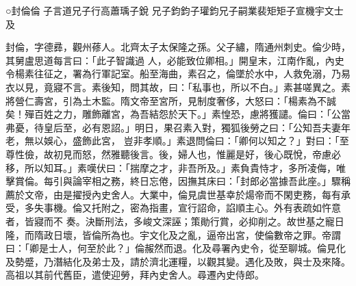
\begin{pinyinscope}

 ○封倫倫
 子言道兄子行高蕭瑀子銳
 兄子鈞鈞子瓘鈞兄子嗣業裴矩矩子宣機宇文士及



 封倫，字德彞，觀州蓚人。北齊太子太保隆之孫。父子繡，隋通州刺史。倫少時，其舅盧思道每言曰：「此子智識過
 人，必能致位卿相。」開皇末，江南作亂，內史令楊素往征之，署為行軍記室。船至海曲，素召之，倫墜於水中，人救免溺，乃易衣以見，竟寢不言。素後知，問其故，曰：「私事也，所以不白。」素甚嗟異之。素將營仁壽宮，引為土木監。隋文帝至宮所，見制度奢侈，大怒曰：「楊素為不誠矣！殫百姓之力，雕飾離宮，為吾結怨於天下。」素惶恐，慮將獲譴。倫曰：「公當弗憂，待皇后至，必有恩詔。」明日，果召素入對，獨狐後勞之曰：「公知吾夫妻年老，無以娛心，盛飾此宮，
 豈非孝順。」素退問倫曰：「卿何以知之？」對曰：「至尊性儉，故初見而怒，然雅聽後言。後，婦人也，惟麗是好，後心既悅，帝慮必移，所以知耳。」素嘆伏曰：「揣摩之才，非吾所及。」素負貴恃才，多所凌侮，唯擊賞倫。每引與論宰相之務，終日忘倦，因撫其床曰：「封郎必當據吾此座。」驟稱薦於文帝，由是擢授內史舍人。大業中，倫見虞世基幸於煬帝而不閑吏務，每有承受，多失事機。倫又托附之，密為指畫，宣行詔命，諂順主心。外有表疏如忤意者，皆寢而不
 奏。決斷刑法，多峻文深誣；策勛行賞，必抑削之。故世基之寵日隆，而隋政日壞，皆倫所為也。宇文化及之亂，逼帝出宮，使倫數帝之罪。帝謂曰：「卿是士人，何至於此？」倫赧然而退。化及尋署內史令，從至聊城。倫見化及勢蹙，乃潛結化及弟士及，請於濟北運糧，以觀其變。遇化及敗，與士及來降。高祖以其前代舊臣，遣使迎勞，拜內史舍人。尋遷內史侍郎。




\end{pinyinscope}
